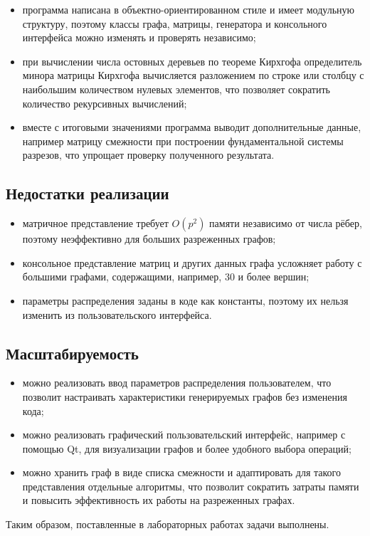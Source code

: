 \begin{itemize}
    \item программа написана в объектно-ориентированном стиле и имеет модульную структуру, поэтому классы графа, матрицы, генератора и консольного интерфейса можно изменять и проверять независимо;
    \item при вычислении числа остовных деревьев по теореме Кирхгофа определитель минора матрицы Кирхгофа вычисляется разложением по строке или столбцу с наибольшим количеством нулевых элементов, что позволяет сократить количество рекурсивных вычислений;
    \item вместе с итоговыми значениями программа выводит дополнительные данные, например матрицу смежности при построении фундаментальной системы разрезов, что упрощает проверку полученного результата.
\end{itemize}

\subsection*{Недостатки реализации}

\begin{itemize}
    \item матричное представление требует $O(p^2)$ памяти независимо от числа рёбер, поэтому неэффективно для больших разреженных графов;
    \item консольное представление матриц и других данных графа усложняет работу с большими графами, содержащими, например, 30 и более вершин;
    \item параметры распределения заданы в коде как константы, поэтому их нельзя изменить из пользовательского интерфейса.
\end{itemize}

\subsection*{Масштабируемость}

\begin{itemize}
    \item можно реализовать ввод параметров распределения пользователем, что позволит настраивать характеристики генерируемых графов без изменения кода;
    \item можно реализовать графический пользовательский интерфейс, например с помощью Qt, для визуализации графов и более удобного выбора операций;
    \item можно хранить граф в виде списка смежности и адаптировать для такого представления отдельные алгоритмы, что позволит сократить затраты памяти и повысить эффективность их работы на разреженных графах.
\end{itemize}

Таким образом, поставленные в лабораторных работах задачи выполнены.
